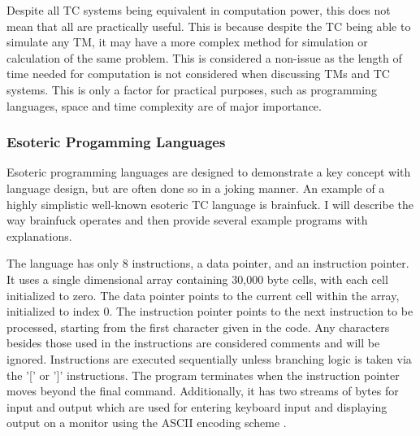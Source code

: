 Despite all TC systems being equivalent in computation power, this does not mean that all are practically useful.
This is because despite the TC being able to simulate any TM, it may have a more complex method for simulation or calculation of the same problem.
This is considered a non-issue as the length of time needed for computation is not considered when discussing TMs and TC systems.
This is only a factor for practical purposes, such as programming languages, space and time complexity are of major importance.

\subsubsection{Esoteric Progamming Languages}\label{subsubsec:EsotericPL}

Esoteric programming languages are designed to demonstrate a key concept with language design, but are often done so in a joking manner.
An example of a highly simplistic well-known esoteric TC language is brainfuck.
I will describe the way brainfuck operates and then provide several example programs with explanations.

The language has only 8 instructions, a data pointer, and an instruction pointer.
It uses a single dimensional array containing 30,000 byte cells, with each cell initialized to zero.
The data pointer points to the current cell within the array, initialized to index 0.
The instruction pointer points to the next instruction to be processed, starting from the first character given in the code.
Any characters besides those used in the instructions are considered comments and will be ignored.
Instructions are executed sequentially unless branching logic is taken via the '[' or ']' instructions.
The program terminates when the instruction pointer moves beyond the final command.
Additionally, it has two streams of bytes for input and output which are used for entering keyboard input and displaying output on a monitor using the ASCII encoding scheme \cite{BfWiki,BfGH}.

